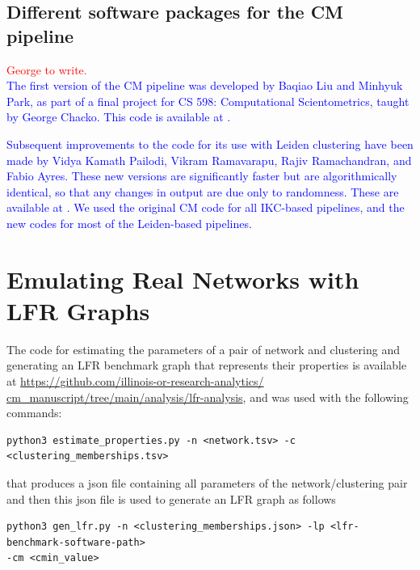 \documentclass[a4paper]{article}   	%
\begin{document}
\subsection{Different software packages for the CM pipeline}
\label{sec:cm-codes}
\textcolor{red}{George to write.}\\
\textcolor{blue}{
The first version of the CM pipeline was developed by Baqiao Liu and Minhyuk Park, as part of a final project for CS 598: Computational Scientometrics,
taught by George Chacko.
This code is available at \cite{cm2022}.}

\textcolor{blue}{
Subsequent improvements to the code for its use with Leiden clustering have been made by Vidya Kamath Pailodi, Vikram Ramavarapu, Rajiv Ramachandran, and Fabio Ayres.
These new versions are significantly faster but are algorithmically identical, so that any changes in output are due only to randomness.
These are available at \cite{new-code-locations}.
We used the original CM code for all IKC-based pipelines, and the new codes for most of the Leiden-based pipelines.}

\clearpage
\section{Emulating Real Networks with LFR Graphs}
 The code for estimating the parameters of a pair of network and clustering and generating an LFR benchmark graph that represents their properties is available at \href{https://github.com/illinois-or-research-analytics/cm_manuscript/tree/main/analysis/lfr-analysis}{https://github.com/illinois-or-research-analytics/} \href{https://github.com/illinois-or-research-analytics/cm_manuscript/tree/main/analysis/lfr-analysis}{cm\_manuscript/tree/main/analysis/lfr-analysis}, and was used with the following commands:

\begin{lstlisting}[basicstyle=\ttfamily\small]
python3 estimate_properties.py -n <network.tsv> -c <clustering_memberships.tsv>
\end{lstlisting}
that produces a json file containing all parameters of the network/clustering pair and then this json file is used to generate an LFR graph as follows

\begin{lstlisting}[basicstyle=\ttfamily\small]
python3 gen_lfr.py -n <clustering_memberships.json> -lp <lfr-benchmark-software-path>
-cm <cmin_value>
\end{lstlisting}
\end{document}
